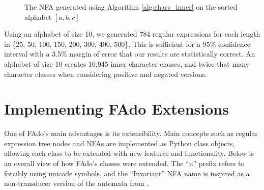 \begin{figure}[H]
  \centering
  \caption{The NFA generated using Algorithm \ref{alg:chars_inner} on the sorted alphabet $[a,b,c]$}
  \label{fig:chars_inner}
\end{figure}

Using an alphabet of size 10, we generated 784 regular expressions for each length in \{25, 50, 100, 150, 200, 300, 400, 500\}. This is sufficient for a 95\% confidence interval with a 3.5\% margin of error that our results are statistically correct. An alphabet of size 10 creates 10,945 inner character classes, and twice that many character classes when considering positive and negated versions.






\section{Implementing FAdo Extensions}
\label{sec:Implementing FAdo Extensions}
One of FAdo's main advantages is its extensibility. Main concepts such as regular expression tree nodes and NFAs are implemented as Python class objects, allowing each class to be extended with new features and functionality. Below is an overall view of how FAdo's classes were extended. The ``u'' prefix refers to forcibly using unicode symbols, and the ``Invariant'' NFA name is inspired as a non-transducer version of the automata from \cite{alphabet-invariant}.

